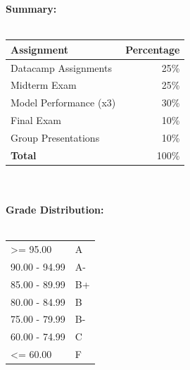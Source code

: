 \documentclass[11pt]{article}
\begin{document}
\newpage
\def\arraystretch{1}%
\textbf {\large Summary:} \\\\
\hspace*{10mm}
\begin{tabular}{ l | r } 
\textbf{Assignment} & \textbf{Percentage} \\
\hline
Datacamp Assignments & 25\% \\
Midterm Exam & 25\% \\
Model Performance (x3) & 30\% \\
Final Exam &  10\% \\
Group Presentations &  10\% \\
\hline
\textbf{Total} & 100\% \\
\end{tabular} \\\\

\textbf {\large Grade Distribution:} \\\\
\hspace*{10mm}
\begin{tabular}{ l l }
\textgreater= 95.00 & A \\
90.00 - 94.99 & A-  \\
85.00 - 89.99 & B+   \\
80.00 - 84.99 & B  \\
75.00 - 79.99 & B-  \\
60.00 - 74.99 & C  \\
\textless= 60.00 & F \\
\end{tabular} \\\\
\end{document}
